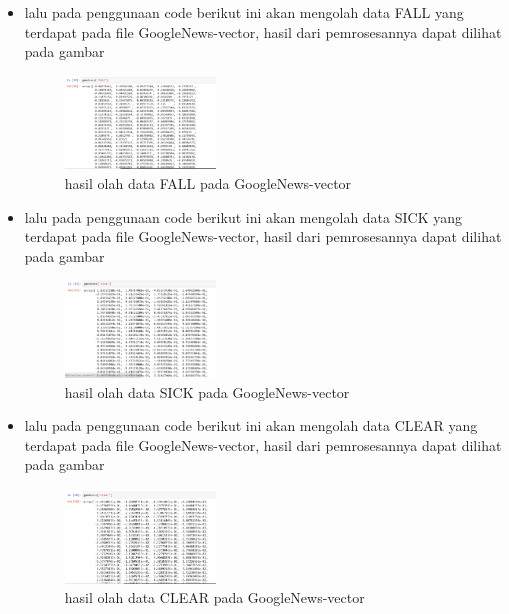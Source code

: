 \begin{enumerate}
\begin{itemize}
        \item  lalu pada penggunaan code berikut ini akan mengolah data FALL yang terdapat pada file GoogleNews-vector, hasil dari pemrosesannya dapat dilihat pada gambar
        \begin{figure}[H]
            \includegraphics[width=4cm]{figures/1174096/tugas5/praktek1-4.PNG}
            \centering
            \caption{hasil olah data FALL pada GoogleNews-vector}
        \end{figure}
        
        \item  lalu pada penggunaan code berikut ini akan mengolah data SICK yang terdapat pada file GoogleNews-vector, hasil dari pemrosesannya dapat dilihat pada gambar
        \begin{figure}[H]
            \includegraphics[width=4cm]{figures/1174096/tugas5/praktek1-5.PNG}
            \centering
            \caption{hasil olah data SICK pada GoogleNews-vector}
        \end{figure}
        
        \item  lalu pada penggunaan code berikut ini akan mengolah data CLEAR yang terdapat pada file GoogleNews-vector, hasil dari pemrosesannya dapat dilihat pada gambar
        \begin{figure}[H]
            \includegraphics[width=4cm]{figures/1174096/tugas5/praktek1-6.PNG}
            \centering
            \caption{hasil olah data CLEAR pada GoogleNews-vector}
        \end{figure}
        

\end{itemize}
\end{enumerate}
